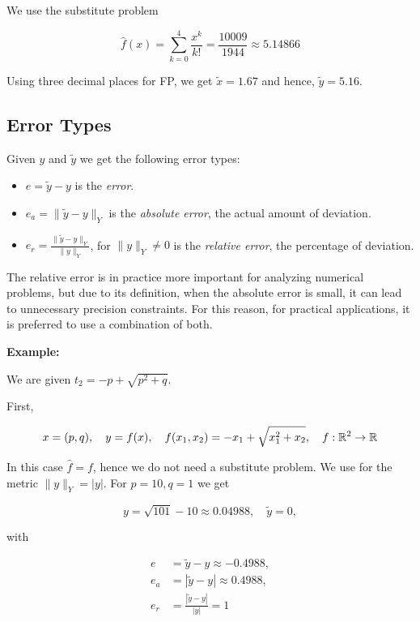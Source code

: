 We use the substitute problem 

\[
    \hat{f}(x) = \sum_{k = 0}^{4} \frac{x^k}{k!} = \frac{10009}{1944} \approx 5.14866
\]

Using three decimal places for FP, we get \(\tilde{x} = 1.67\) and hence, \(\tilde{y} = 5.16\). 

\subsection{Error Types}

Given \(y\) and \(\tilde{y}\) we get the following error types:

\begin{itemize}

    \item \(e = \tilde{y} - y\) is the \emph{error}.

    \item \(e_a = \|\tilde{y} - y\|_Y\) is the \emph{absolute error}, the actual amount of deviation.

    \item \(e_r = \frac{\|\tilde{y} - y\|_Y}{\|y\|_Y}\), for \(\|y\|_Y \ne 0\) is the \emph{relative error}, the percentage of deviation.

\end{itemize}

The relative error is in practice more important for analyzing numerical problems, but due to its definition, when 
the absolute error is small, it can lead to unnecessary precision constraints. For this reason, 
for practical applications, it is preferred to use a combination of both.

\textbf{Example:}

We are given \(t_2 = -p + \sqrt{p^2 + q}\). 

First,

\[
    x = (p, q), \quad y = f(x), \quad f(x_1, x_2) = -x_1 + \sqrt{x_1^2 + x_2}, \quad f: \mathbb{R}^2 \to \mathbb{R}
\]

In this case \(\hat{f} = f\), hence we do not need a substitute problem. We use for the metric \(\|y\|_Y = |y|\). 
For \(p = 10, q = 1\) we get  

\[
    y = \sqrt{101} - 10 \approx 0.04988, \quad \tilde{y} = 0,
\]

with 

\begin{align*}    
    e &= \tilde{y} - y \approx -0.4988, \\ 
    e_a &= |\tilde{y} - y| \approx 0.4988, \\ 
    e_r &= \frac{|\tilde{y} - y|}{|y|} = 1
\end{align*}

